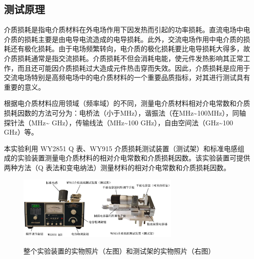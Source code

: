 \documentclass[a4paper,utf8]{article}
\begin{document}
    \subsection{测试原理}
        介质损耗是指电介质材料在外电场作用下因发热而引起的功率损耗。直流电场中电介质的损耗主要是由电导电流造成的电导损耗。此外，交流电场作用中电介质的损耗还有极化损耗。由于电场频繁转向，电介质的极化损耗要比电导损耗大得多，故介质损耗通常是指交流损耗。介质损耗不但会消耗电能，使元件发热影响其正常工作，而且还可能因介质损耗过大造成元件热击穿而失效。因此，介质损耗是应用于交流电场特别是高频电场中的电介质材料的一个重要品质指标，对其进行测试具有重要的意义。\par
        根据电介质材料应用领域（频率域）的不同，测量电介质材料相对介电常数和介质损耗因数的方法可分为：电桥法（小于\unit{\mega\hertz}），谐振法（在\unit{\mega\hertz}\~{}100\unit{\mega\hertz}），同轴探针法（\unit{\mega\hertz}\~{} \unit{\giga\hertz}），传输线法（\unit{\mega\hertz}\~{}100 \unit{\giga\hertz}），自由空间法（\unit{\giga\hertz}\~{}100 \unit{\giga\hertz}）等。\par
        本实验利用 WY2851 Q 表、WY915 介质损耗测试装置（测试架）和标准电感组成的实验装置测量电介质材料的相对介电常数和介质损耗因数。该实验装置可提供两种方法（Q 表法和变电纳法）测量材料的相对介电常数和介质损耗因数。
        \begin{figure}[!ht]\centering
            \includegraphics[width=80mm]{fg3.jpg}\
            \caption{整个实验装置的实物照片（左图）和测试架的实物照片（右图）\label{fig:3}}
        \end{figure}
\end{document}
